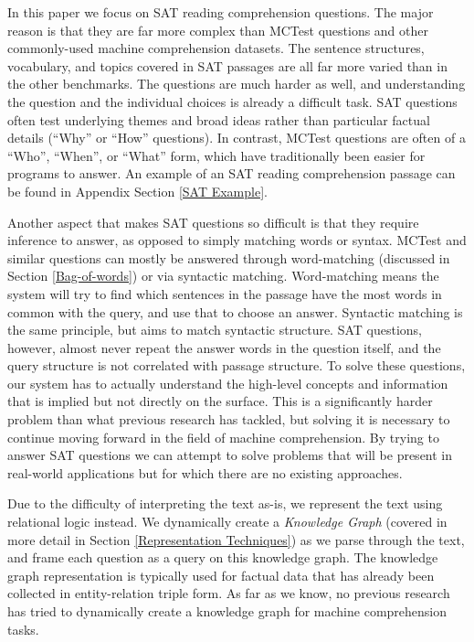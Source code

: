 \documentclass[pageno]{final_paper}
\begin{document}
In this paper we focus on SAT reading comprehension questions. The major reason
is that they are far more complex than MCTest questions and other commonly-used
machine comprehension datasets. The sentence structures, vocabulary, and topics
covered in SAT passages are all far more varied than in the other benchmarks.
The questions are much harder as well, and understanding the question and the
individual choices is already a difficult task. SAT questions often test
underlying themes and broad ideas rather than particular factual details
(``Why'' or ``How'' questions). In contrast, MCTest questions are often of a
``Who'', ``When'', or ``What'' form, which have traditionally been easier for
programs to answer. An example of an SAT reading comprehension passage can be
found in Appendix Section \ref{SAT Example}.

Another aspect that makes SAT questions so difficult is that they require
inference to answer, as opposed to simply matching words or syntax. MCTest and
similar questions can mostly be answered through word-matching (discussed in
Section \ref{Bag-of-words}) or via syntactic matching. Word-matching means the
system will try to find which sentences in the passage have the most words in
common with the query, and use that to choose an answer. Syntactic matching is
the same principle, but aims to match syntactic structure. SAT questions,
however, almost never repeat the answer words in the question itself, and the
query structure is not correlated with passage structure. To solve these
questions, our system has to actually understand the high-level concepts and
information that is implied but not directly on the surface. This is a
significantly harder problem than what previous research has tackled, but
solving it is necessary to continue moving forward in the field of machine
comprehension. By trying to answer SAT questions we can attempt to solve
problems that will be present in real-world applications but for which there are
no existing approaches.

Due to the difficulty of interpreting the text as-is, we represent the text
using relational logic instead. We dynamically create a \textit{Knowledge Graph}
(covered in more detail in Section \ref{Representation Techniques}) as we parse
through the text, and frame each question as a query on this knowledge graph.
The knowledge graph representation is typically used for factual data that has
already been collected in entity-relation triple form. As far as we know, no
previous research has tried to dynamically create a knowledge graph for machine
comprehension tasks.
\end{document}
